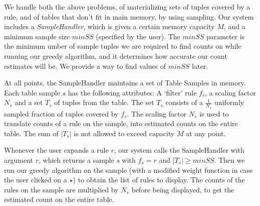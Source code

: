 \documentclass{sig-alternate}
\begin{document}
We handle both the above problems, of materializing sets of tuples covered by a rule, and of tables that don't fit in main memory, by using sampling. Our system includes a {\em SampleHandler}, which is given a certain memory capacity $M$, and a minimum sample size $minSS$ (specified by the user).
The $minSS$ parameter is the minimum umber of sample tuples we are required to find counts on while running our greedy algorithm, and it determines how accurate our count estimates will be. We provide a way to find values of $minSS$ later.

At all points, the SampleHandler maintains a set of Table Samples in memory. Each table sample $s$ has the following attributes: A `filter' rule $f_s$, a scaling factor $N_s$ and a set $T_s$ of tuples from the table. The set $T_s$ consists of a $\frac{1}{N_s}$ uniformly sampled fraction of tuples covered by $f_s$. The scaling factor $N_s$ is used to translate counts of a rule on the sample, into estimated counts on the entire table. The sum of $|T_s|$ is not allowed to exceed capacity $M$ at any point. 

Whenever the user expands a rule $r$, our system calls the SampleHandler with argument $r$, which returns a sample $s$ with $f_s = r$ and $|T_s| \geq minSS$. Then we run our greedy algorithm on the sample (with a modified weight function in case the user clicked on a $\star$) to obtain the list of rules to display. The counts of the rules on the sample are multiplied by $N_s$ before being displayed, to get the estimated count on the entire table. 
\end{document}
